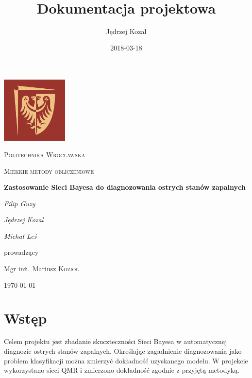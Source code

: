 \documentclass{article}
\title{Dokumentacja projektowa}
\date{2018-03-18}
\author{Jędrzej Kozal}
\begin{document}
\begin{titlepage}
	\centering
	\includegraphics[width=0.25\textwidth]{logo_pol_wroclaw.png}\par\vspace{1cm}
	{\scshape\LARGE Politechnika Wrocławska \par}
	\vspace{1cm}
	{\scshape\Large Miekkie metody obliczeniowe\par}
	\vspace{1.5cm}
	{\huge\bfseries Zastosowanie Sieci Bayesa do diagnozowania ostrych stanów zapalnych \par}
	\vspace{2cm}
	{\Large\itshape Filip Guzy\par}
	{\Large\itshape Jędrzej Kozal\par}
	{\Large\itshape Michał Leś\par}

	\vfill
	prowadzący\par
	Mgr inż.~Mariusz \textsc{Kozioł}

	\vfill

	{\large \today\par}
\end{titlepage}

\tableofcontents
\newpage


\section{Wstęp}

Celem projektu jest zbadanie skuczteczności Sieci Bayesa w automatycznej diagnozie ostrych stanów zapalnych. Określając zagadnienie diagnozowania jako problem klasyfikacji można zmierzyć dokładność uzyskanego modelu. W projekcie wykorzystano sieci QMR i zmierzono dokładność zgodnie z przyjętą metodyką.
\end{document}
